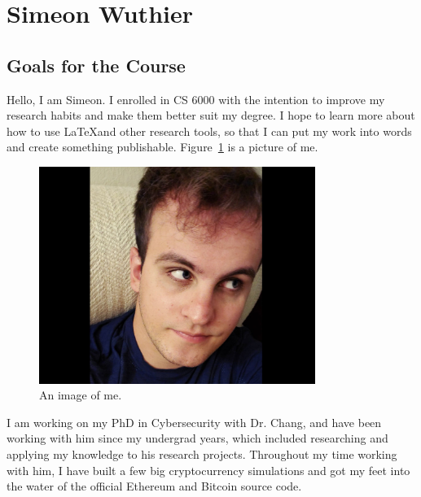 \section{Simeon Wuthier}
\subsection{Goals for the Course}
Hello, I am Simeon. I enrolled in CS 6000 with the intention to improve my research habits and make them better suit my degree. I hope to learn more about how to use \LaTeX and other research tools, so that I can put my work into words and create something publishable. Figure~\ref{fig:simeon} is a picture of me.

\begin{figure}[htp]
    \centerline{
        \includegraphics[width=0.8\textwidth]{Simeon.jpg}
    }
    \caption{An image of me.} \label{fig1}
    \label{fig:simeon}
\end{figure}

I am working on my PhD in Cybersecurity with Dr. Chang, and have been working with him since my undergrad years, which included researching and applying my knowledge to his research projects. Throughout my time working with him, I have built a few big cryptocurrency simulations and got my feet into the water of the official Ethereum and Bitcoin source code.

